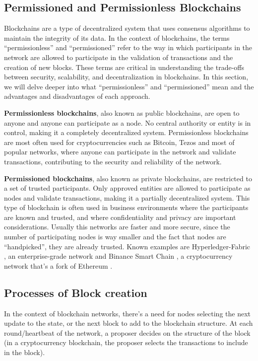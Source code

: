 \subsection*{Permissioned and Permissionless Blockchains}

Blockchains are a type of decentralized system that uses consensus algorithms to maintain the integrity of its data. In the context of blockchains, the terms ``permissionless'' and ``permissioned'' refer to the way in which participants in the network are allowed to participate in the validation of transactions and the creation of new blocks.
These terms are critical in understanding the trade-offs between security, scalability, and decentralization in blockchains. In this section, we will delve deeper into what ``permissionless'' and ``permissioned'' mean and the advantages and disadvantages of each approach.

\textbf{Permissionless blockchains}, also known as public blockchains, are open to anyone and anyone can participate as a node. No central authority or entity is in control, making it a completely decentralized system. Permissionless blockchains are most often used for cryptocurrencies such as Bitcoin, Tezos and most of popular networks, where anyone can participate in the network and validate transactions, contributing to the security and reliability of the network.

\textbf{Permissioned blockchains}, also known as private blockchains, are restricted to a set of trusted participants. Only approved entities are allowed to participate as nodes and validate transactions, making it a partially decentralized system. This type of blockchain is often used in business environments where the participants are known and trusted, and where confidentiality and privacy are important considerations. Usually this networks are faster and more secure, since the number of participating nodes is way smaller and the fact that nodes are ``handpicked'', they are already trusted.
Known examples are Hyperledger-Fabric \cite{androulaki2018hyperledger}, an enterprise-grade network and Binance Smart Chain \cite{bnb-chain_2022}, a cryptocurrency network that's a fork of Ethereum \cite{ethereum_foundation}.

\subsection*{Processes of Block creation}
In the context of blockchain networks, there's a need for nodes selecting the next update to the state, or the next block to add to the blockchain structure. At each round/heartbeat of the network, a proposer decides on the structure of the block (in a cryptocurrency blockchain, the proposer selects the transactions to include in the block).

